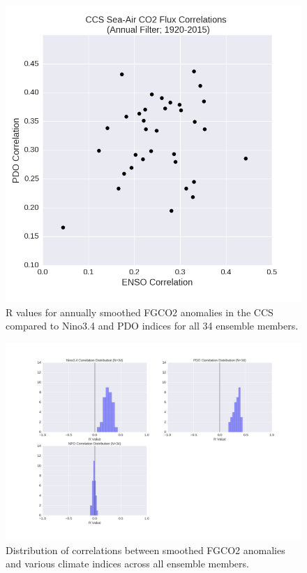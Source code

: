 \documentclass[12pt]{article}
\begin{document}
\begin{figure}[!h]
	\centering
	\includegraphics[width=29pc]{../../figs/calcs/correlations_scatter/CCS-ENSO-PDO-Correlation-Scatter.png}
	\caption{R values for annually smoothed FGCO2 anomalies in the CCS compared to Nino3.4 and PDO indices for all 34 ensemble members.}
	\label{fig:7}
\end{figure}
\begin{figure}[!h]
	\centering
	\includegraphics[width=\linewidth]{../../figs/calcs/histograms/calcs-correlation-histograms.png}
	\caption{Distribution of correlations between smoothed FGCO2 anomalies and various climate indices across all ensemble members.}
	\label{fig:8}
\end{figure}
\end{document}
